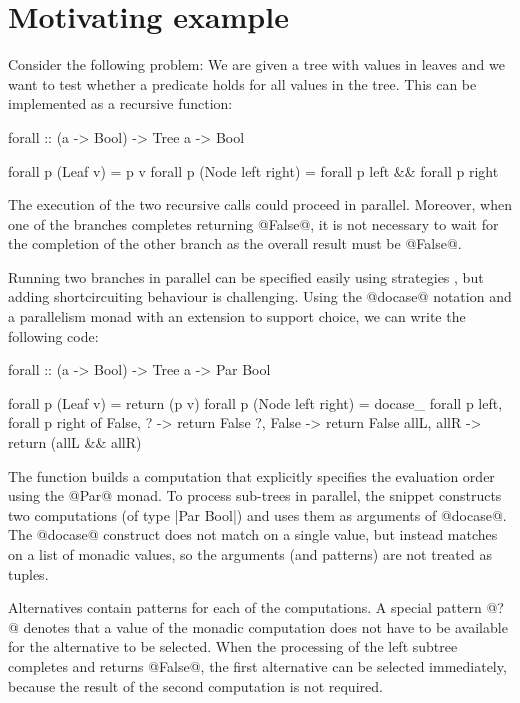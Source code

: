 \documentclass[preprint]{sigplanconf}
\begin{document}

\section{Motivating example}
\label{sec:motivation}

Consider the following problem: We are given a tree with values in leaves and we want to test
whether a predicate holds for all values in the tree. This can be implemented as a recursive function:

\begin{code}
forall :: (a -> Bool) -> Tree a -> Bool

forall p (Leaf v)           = p v
forall p (Node left right)  = forall p left && forall p right
\end{code}
The execution of the two recursive calls could proceed in parallel. Moreover, when one of the 
branches completes returning @False@, it is not necessary to wait for the completion of the other 
branch as the overall result must be @False@.

Running two branches in parallel can be specified easily using strategies \cite{strategies-new, strategies-old}, 
but adding shortcircuiting behaviour is challenging. Using the @docase@ notation and a parallelism monad 
\cite{parmonad} with an extension to support choice, we can write the following code:
\begin{code}
forall :: (a -> Bool) -> Tree a -> Par Bool

forall p (Leaf v)           = return (p v)
forall p (Node left right)  = 
  docase_ forall p left, forall p right of
    False, ?    -> return False
    ?, False    -> return False
    allL, allR  -> return (allL && allR)
\end{code}
The function builds a computation that explicitly specifies the evaluation order using the
@Par@ monad. To process sub-trees in parallel, the snippet constructs two computations (of type |Par Bool|) 
and uses them as arguments of @docase@. The @docase@ construct does not match on a single value, 
but instead matches on a list of monadic values, so the arguments (and patterns) are not treated 
as tuples.

Alternatives contain patterns for each of the computations. A special pattern @?@ denotes
that a value of the monadic computation does not have to be available for the alternative to be 
selected. When the processing of the left subtree completes and returns @False@, the first 
alternative can be selected immediately, because the result of the second computation is not 
required.
\end{document}
